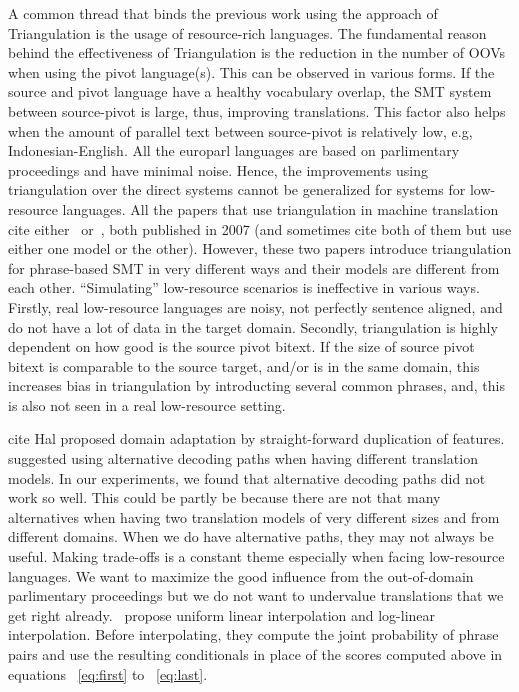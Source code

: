  
 A common thread that binds the previous work using the approach of Triangulation is the usage of resource-rich languages. The fundamental reason behind the effectiveness of Triangulation is the reduction in the number of OOVs when using the pivot language(s). This can be observed in various forms. If the source and pivot language have a healthy vocabulary overlap, the SMT system between source-pivot is large, thus, improving translations. This factor also helps when the amount of parallel text between source-pivot is relatively low, e.g, Indonesian-English.  All the europarl languages are based on parlimentary proceedings and have minimal noise. Hence, the improvements using triangulation over the direct systems cannot be generalized for systems for low-resource languages. All the papers that use triangulation in machine translation cite either~\cite{Utiyama:07} or~\cite{Cohn:07}, both published in 2007 (and sometimes cite both of them but use either one model or the other). However, these two papers introduce triangulation for phrase-based SMT in very different ways and their models are different from each other. ``Simulating'' low-resource scenarios is ineffective in various ways. Firstly, real low-resource languages are noisy, not perfectly sentence aligned, and do not have a lot of data in the target domain. Secondly, triangulation is highly dependent on how good is the source pivot bitext. If the size of source pivot bitext is comparable to the source target, and/or is in the same domain, this increases bias in triangulation by introducting several common phrases, and, this is also not seen in a real low-resource setting.

 \alert{cite Hal} proposed domain adaptation by straight-forward duplication of features.~\cite{Bertoldi:08} suggested using alternative decoding paths when having different translation models. In our experiments, we found that alternative decoding paths did not work so well. This could be partly be because there are not that many alternatives when having two translation models of very different sizes and from different domains. When we do have alternative paths, they may not always be useful. Making trade-offs is a constant theme especially when facing low-resource languages. We want to maximize the good influence from the out-of-domain parlimentary proceedings but we do not want to undervalue translations that we get right already.~\cite{Cohn:07} propose uniform linear interpolation and log-linear interpolation. Before interpolating, they compute the joint probability of phrase pairs and use the resulting conditionals in place of the scores computed above in equations ~\eqref{eq:first} to ~\eqref{eq:last}.


